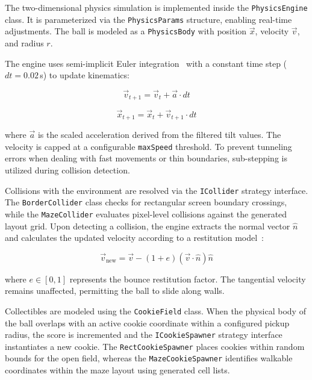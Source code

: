 \documentclass[10pt,journal,final,a4paper]{IEEEtran}
\begin{document}
The two-dimensional physics simulation is implemented inside the \texttt{PhysicsEngine} class. It is parameterized via the \texttt{PhysicsParams} structure, enabling real-time adjustments. The ball is modeled as a \texttt{PhysicsBody} with position $\vec{x}$, velocity $\vec{v}$, and radius $r$.

The engine uses semi-implicit Euler integration~\cite{TRNKA1997277} with a constant time step ($dt = 0.02$\,s) to update kinematics:

\begin{equation}
    \vec{v}_{t+1} = \vec{v}_t + \vec{a} \cdot dt
\end{equation}

\begin{equation}
    \vec{x}_{t+1} = \vec{x}_t + \vec{v}_{t+1} \cdot dt
\end{equation}

where $\vec{a}$ is the scaled acceleration derived from the filtered tilt values. The velocity is capped at a configurable \texttt{maxSpeed} threshold.
To prevent tunneling errors when dealing with fast movements or thin boundaries, sub-stepping is utilized during collision detection.

Collisions with the environment are resolved via the \texttt{ICollider} strategy interface. The \texttt{BorderCollider} class checks for rectangular screen boundary crossings, while the \texttt{MazeCollider} evaluates pixel-level collisions against the generated layout grid.
Upon detecting a collision, the engine extracts the normal vector $\hat{n}$ and calculates the updated velocity according to a restitution model~\cite{wang2017bounce}:

\begin{equation}
    \vec{v}_{\text{new}} = \vec{v} - (1 + e)(\vec{v} \cdot \hat{n})\hat{n}
\end{equation}

where $e \in [0, 1]$ represents the bounce restitution factor. The tangential velocity remains unaffected, permitting the ball to slide along walls.

Collectibles are modeled using the \texttt{CookieField} class.
When the physical body of the ball overlaps with an active cookie coordinate within a configured pickup radius, the score is incremented and the \texttt{ICookieSpawner} strategy interface instantiates a new cookie.
The \texttt{RectCookieSpawner} places cookies within random bounds for the open field, whereas the \texttt{MazeCookieSpawner} identifies walkable coordinates within the maze layout using generated cell lists.
\end{document}
